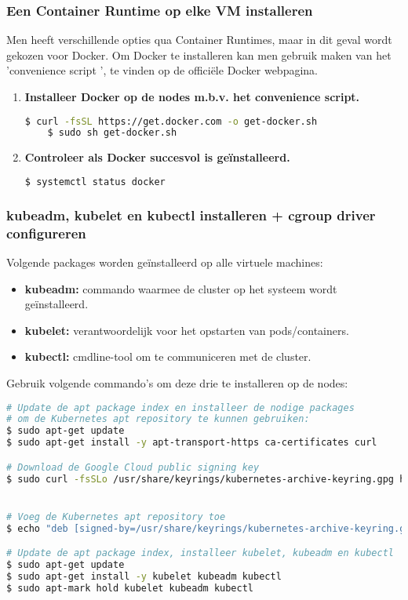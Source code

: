 \subsubsection{Een Container Runtime op elke VM installeren}

Men heeft verschillende opties qua Container Runtimes, maar in dit geval wordt gekozen voor Docker. Om Docker te installeren kan men gebruik maken van het 'convenience script ', te vinden op de officiële Docker webpagina. \autocite{Docker2021}
\begin{enumerate}
        \item {\bf Installeer Docker op de nodes m.b.v. het convenience script.}   
\begin{lstlisting}[language=bash]
    $ curl -fsSL https://get.docker.com -o get-docker.sh
    $ sudo sh get-docker.sh    
\end{lstlisting}
    
    \item {\bf Controleer als Docker succesvol is geïnstalleerd.}
\begin{lstlisting}[language=bash]  
    $ systemctl status docker
\end{lstlisting}
\end{enumerate}

\subsubsection{kubeadm, kubelet en kubectl installeren + cgroup driver configureren}

Volgende packages worden geïnstalleerd op alle virtuele machines:
\begin{itemize}
    \item {\bf kubeadm:} commando waarmee de cluster op het systeem wordt geïnstalleerd.
    \item {\bf kubelet:} verantwoordelijk voor het opstarten van pods/containers.
    \item {\bf kubectl:} cmdline-tool om te communiceren met de cluster.
\end{itemize}

Gebruik volgende commando's om deze drie te installeren op de nodes:
\begin{lstlisting}[language=bash]
# Update de apt package index en installeer de nodige packages 
# om de Kubernetes apt repository te kunnen gebruiken:
$ sudo apt-get update
$ sudo apt-get install -y apt-transport-https ca-certificates curl

# Download de Google Cloud public signing key
$ sudo curl -fsSLo /usr/share/keyrings/kubernetes-archive-keyring.gpg https://packages.cloud.google.com/apt/doc/apt-key.gpg


# Voeg de Kubernetes apt repository toe 
$ echo "deb [signed-by=/usr/share/keyrings/kubernetes-archive-keyring.gpg] https://apt.kubernetes.io/ kubernetes-xenial main" | sudo tee /etc/apt/sources.list.d/kubernetes.list

# Update de apt package index, installeer kubelet, kubeadm en kubectl
$ sudo apt-get update
$ sudo apt-get install -y kubelet kubeadm kubectl
$ sudo apt-mark hold kubelet kubeadm kubectl
\end{lstlisting}

